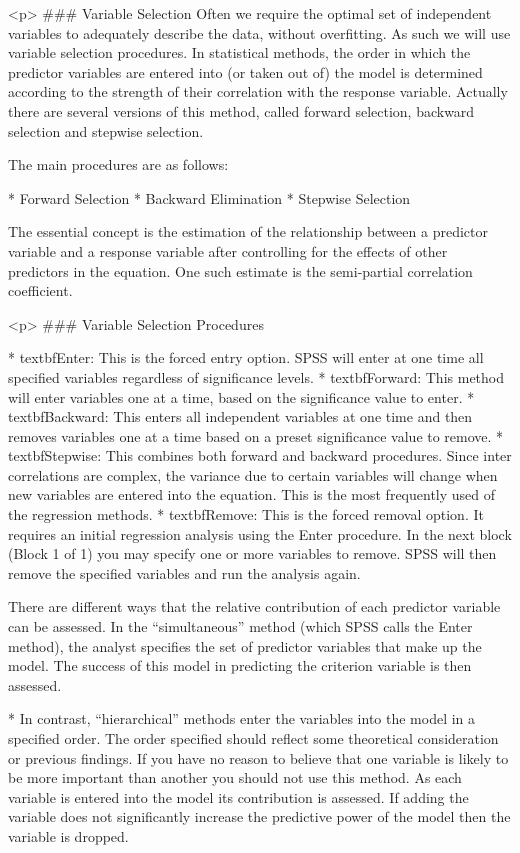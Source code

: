 
<p>
### {Variable Selection}
Often we require the optimal set of independent variables to adequately describe the data, without overfitting. As such we will use variable selection procedures. In statistical methods, the order in which the predictor variables are entered into (or taken out of) the model is determined according to the strength of their correlation with the response variable. Actually there are several versions of this method, called forward selection, backward selection and stepwise selection.

The main procedures are as follows:

	         * Forward Selection
	         * Backward Elimination
	         * Stepwise Selection


The essential concept is the estimation of the relationship between a predictor
variable and a response variable after controlling for the effects of other
predictors in the equation. One such estimate is the semi-partial correlation coefficient.


<p>
### {Variable Selection Procedures}


         * textbf{Enter}: This is the forced entry option. SPSS will enter at one time all specified variables regardless of significance levels.
         * textbf{Forward}: This method will enter variables one at a time, based on the significance value to enter.
         * textbf{Backward}: This enters all independent variables at one time and then removes variables one at a time based on a preset significance value to remove.
         * textbf{Stepwise}: This combines both forward and backward procedures. Since inter correlations are complex, the variance due to certain variables will change when new variables are entered into the equation. This is the most frequently used of the regression methods.
         * textbf{Remove}: This is the forced removal option. It requires an initial regression analysis using the Enter procedure. In the next block (Block 1 of 1) you may specify one or more variables to remove. SPSS will then remove the specified variables and run the analysis again.

There are different ways that the relative contribution of each predictor variable can be assessed. In the “simultaneous” method (which SPSS calls the Enter method), the analyst specifies the set of predictor variables that make up the model. The success of this model in predicting the criterion variable is then assessed.


	         * In contrast, “hierarchical” methods enter the variables into the model in a specified order. The order specified should reflect some theoretical consideration or previous
	findings. If you have no reason to believe that one variable is likely to be more important than another you should not use this method. As each variable is entered into the model its contribution is assessed. If adding the variable does not significantly increase the predictive power of the model then the variable is
	dropped.
	
